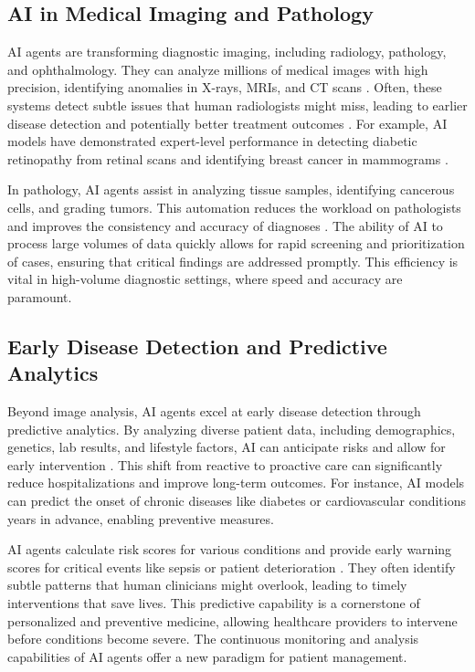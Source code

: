 \documentclass[12pt,a4paper]{article}
\begin{document}
\subsection{AI in Medical Imaging and Pathology}
\label{sec:imaging_pathology}
AI agents are transforming diagnostic imaging, including radiology, pathology, and ophthalmology. They can analyze millions of medical images with high precision, identifying anomalies in X-rays, MRIs, and CT scans \cite{rajpurkar2017chexnet}. Often, these systems detect subtle issues that human radiologists might miss, leading to earlier disease detection and potentially better treatment outcomes \cite{topol2019highperformance}. For example, AI models have demonstrated expert-level performance in detecting diabetic retinopathy from retinal scans and identifying breast cancer in mammograms \cite{esteva2017dermatologist, mckinney2020international}.

In pathology, AI agents assist in analyzing tissue samples, identifying cancerous cells, and grading tumors. This automation reduces the workload on pathologists and improves the consistency and accuracy of diagnoses \cite{campanella2019deep}. The ability of AI to process large volumes of data quickly allows for rapid screening and prioritization of cases, ensuring that critical findings are addressed promptly. This efficiency is vital in high-volume diagnostic settings, where speed and accuracy are paramount.

\subsection{Early Disease Detection and Predictive Analytics}
\label{sec:early_detection}
Beyond image analysis, AI agents excel at early disease detection through predictive analytics. By analyzing diverse patient data, including demographics, genetics, lab results, and lifestyle factors, AI can anticipate risks and allow for early intervention \cite{ibm_watson_health}. This shift from reactive to proactive care can significantly reduce hospitalizations and improve long-term outcomes. For instance, AI models can predict the onset of chronic diseases like diabetes or cardiovascular conditions years in advance, enabling preventive measures.

AI agents calculate risk scores for various conditions and provide early warning scores for critical events like sepsis or patient deterioration \cite{nih_ethical_implications}. They often identify subtle patterns that human clinicians might overlook, leading to timely interventions that save lives. This predictive capability is a cornerstone of personalized and preventive medicine, allowing healthcare providers to intervene before conditions become severe. The continuous monitoring and analysis capabilities of AI agents offer a new paradigm for patient management.
\end{document}
